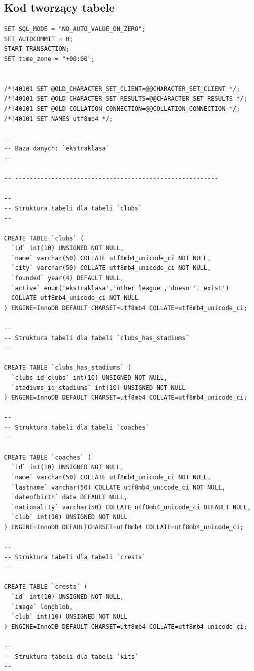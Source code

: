 \documentclass[12pt,a4paper]{article}
\begin{document}
    \subsection{Kod tworzący tabele}
    \begin{verbatim}
SET SQL_MODE = "NO_AUTO_VALUE_ON_ZERO";
SET AUTOCOMMIT = 0;
START TRANSACTION;
SET time_zone = "+00:00";


/*!40101 SET @OLD_CHARACTER_SET_CLIENT=@@CHARACTER_SET_CLIENT */;
/*!40101 SET @OLD_CHARACTER_SET_RESULTS=@@CHARACTER_SET_RESULTS */;
/*!40101 SET @OLD_COLLATION_CONNECTION=@@COLLATION_CONNECTION */;
/*!40101 SET NAMES utf8mb4 */;

--
-- Baza danych: `ekstraklasa`
--

-- --------------------------------------------------------

--
-- Struktura tabeli dla tabeli `clubs`
--

CREATE TABLE `clubs` (
  `id` int(10) UNSIGNED NOT NULL,
  `name` varchar(50) COLLATE utf8mb4_unicode_ci NOT NULL,
  `city` varchar(50) COLLATE utf8mb4_unicode_ci NOT NULL,
  `founded` year(4) DEFAULT NULL,
  `active` enum('ekstraklasa','other league','doesn''t exist') 
  COLLATE utf8mb4_unicode_ci NOT NULL
) ENGINE=InnoDB DEFAULT CHARSET=utf8mb4 COLLATE=utf8mb4_unicode_ci;

--
-- Struktura tabeli dla tabeli `clubs_has_stadiums`
--

CREATE TABLE `clubs_has_stadiums` (
  `clubs_id_clubs` int(10) UNSIGNED NOT NULL,
  `stadiums_id_stadiums` int(10) UNSIGNED NOT NULL
) ENGINE=InnoDB DEFAULT CHARSET=utf8mb4 COLLATE=utf8mb4_unicode_ci;

--
-- Struktura tabeli dla tabeli `coaches`
--

CREATE TABLE `coaches` (
  `id` int(10) UNSIGNED NOT NULL,
  `name` varchar(50) COLLATE utf8mb4_unicode_ci NOT NULL,
  `lastname` varchar(50) COLLATE utf8mb4_unicode_ci NOT NULL,
  `dateofbirth` date DEFAULT NULL,
  `nationality` varchar(50) COLLATE utf8mb4_unicode_ci DEFAULT NULL,
  `club` int(10) UNSIGNED NOT NULL
) ENGINE=InnoDB DEFAULTCHARSET=utf8mb4 COLLATE=utf8mb4_unicode_ci;

--
-- Struktura tabeli dla tabeli `crests`
--

CREATE TABLE `crests` (
  `id` int(10) UNSIGNED NOT NULL,
  `image` longblob,
  `club` int(10) UNSIGNED NOT NULL
) ENGINE=InnoDB DEFAULT CHARSET=utf8mb4 COLLATE=utf8mb4_unicode_ci;

--
-- Struktura tabeli dla tabeli `kits`
--


\end{verbatim}
\end{document}
